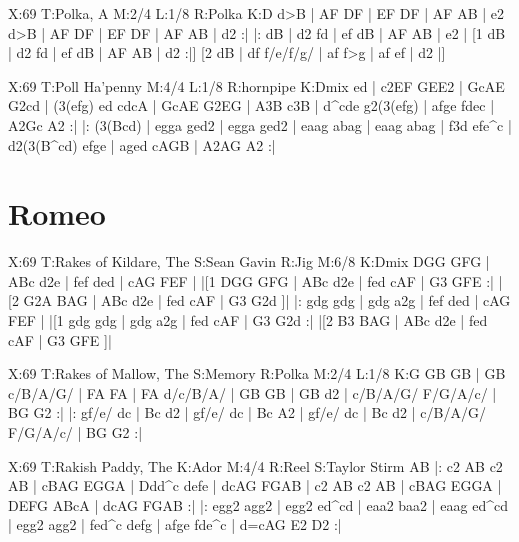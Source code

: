\documentclass{article}
\begin{document}
\begin{abc}[name]
X:69
T:Polka, A
M:2/4
L:1/8
R:Polka
K:D
d>B | AF DF | EF DF | AF AB | e2 d>B |
AF DF | EF DF | AF AB | d2 :|
|: dB | d2 fd | ef dB | AF AB | e2 |
[1 dB | d2 fd | ef dB | AF AB | d2 :|]
[2 dB | df f/e/f/g/ | af f>g | af ef | d2 |]
\end{abc}

\begin{abc}[name]
X:69
T:Poll Ha'penny
M:4/4
L:1/8
R:hornpipe
K:Dmix
ed | c2EF GEE2 | GcAE G2cd | (3(efg) ed cdcA | GcAE G2EG | 
A3B c3B | d^cde g2(3(efg) | afge fdec | A2Gc A2 :|
|: (3(Bcd) | egga ged2 | egga ged2 | eaag abag | eaag abag | 
f3d efe^c | d2(3(B^cd) efge | aged cAGB | A2AG A2 :|
\end{abc}

\section{Romeo}

\begin{abc}[name]
X:69
T:Rakes of Kildare, The
S:Sean Gavin
R:Jig
M:6/8
K:Dmix
DGG GFG | ABc d2e | fef ded | cAG FEF |
|[1 DGG GFG | ABc d2e | fed cAF | G3 GFE :|
|[2 G2A BAG | ABc d2e | fed cAF | G3 G2d ]|
|: gdg gdg | gdg a2g | fef ded | cAG FEF |
|[1 gdg gdg | gdg a2g | fed cAF | G3 G2d :|
|[2 B3 BAG | ABc d2e | fed cAF | G3 GFE ]|
\end{abc}

\begin{abc}[name]
X:69
T:Rakes of Mallow, The
S:Memory
R:Polka
M:2/4
L:1/8
K:G
GB GB | GB c/B/A/G/ | FA FA | FA d/c/B/A/ |
GB GB | GB d2 | c/B/A/G/ F/G/A/c/ | BG G2 :|
|: gf/e/ dc | Bc d2 | gf/e/ dc | Bc A2 |
gf/e/ dc | Bc d2 | c/B/A/G/ F/G/A/c/ | BG G2 :| 
\end{abc}

\begin{abc}[name]
X:69
T:Rakish Paddy, The
K:Ador
M:4/4
R:Reel
S:Taylor Stirm
AB |: c2 AB c2 AB | cBAG EGGA | Ddd^c defe | dcAG FGAB |
c2 AB c2 AB | cBAG EGGA | DEFG ABcA | dcAG FGAB :|
|: egg2 agg2 | egg2 ed^cd | eaa2 baa2 | eaag ed^cd |
egg2 agg2 | fed^c defg | afge fde^c | d=cAG E2 D2 :|
\end{abc}
\end{document}
